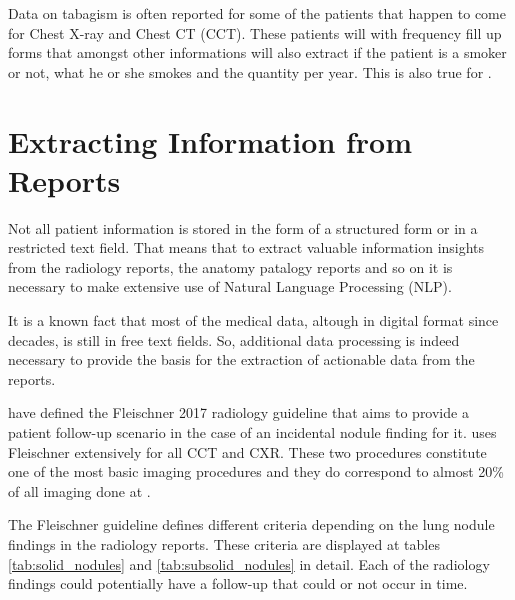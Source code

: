Data on tabagism is often reported for some of the patients that happen to come for Chest X-ray and Chest CT (CCT). These patients will with frequency fill up forms that amongst other informations will also extract if the patient is a smoker or not, what he or she smokes and the quantity per year. This is also true for \nomeHsl{}. 

\section{Extracting Information from Reports}

Not all patient information is stored in the form of a structured form or in a restricted text field. That means that to extract valuable information insights from the radiology reports, the anatomy patalogy reports and so on it is necessary to make extensive use of Natural Language Processing (NLP). %

It is a known  fact that most of the medical data, altough in digital format since decades, is still in free text fields. %
So, additional data processing is indeed necessary to provide the basis for the extraction of actionable data from the reports.

 have defined the Fleischner 2017 radiology guideline that aims to provide a patient follow-up scenario in the case of an incidental nodule finding for it. \nomeHsl{} uses Fleischner extensively for all CCT and CXR. These two procedures constitute one of the most basic imaging procedures and they do correspond to almost 20\% of all imaging done at \nomeHslShort{}. %

The Fleischner guideline defines different criteria depending on the lung nodule findings in the radiology reports. These criteria are displayed at tables \ref{tab:solid_nodules} and \ref{tab:subsolid_nodules} in detail. Each of the radiology findings could potentially have a follow-up that could or not occur in time.


